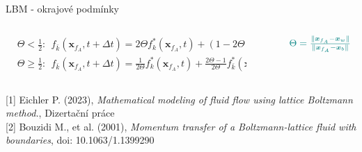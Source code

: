 \documentclass[aspectratio=169,xcolor=dvipsnames]{beamer}
\begin{document}
\begin{frame}{LBM - okrajové podmínky}
\begin{columns}
\begin{column}{.63\textwidth}
			$\begin{aligned}
				& \Theta<\frac{1}{2}: \ \ f_{\bar{k}}\left(\boldsymbol{x}_{f_A}, t+\Delta t\right)=2 \Theta f_k^*\left(\boldsymbol{x}_{f_A}, t\right)+(1-2 \Theta) f_k^*\left(\boldsymbol{x}_{f_B}, t\right) \\
				& \Theta \geq \frac{1}{2}: \ \ f_{\bar{k}}\left(\boldsymbol{x}_{f_A}, t+\Delta t\right)=\frac{1}{2 \Theta} f_k^*\left(\boldsymbol{x}_{f_A}, t\right)+\frac{2 \Theta-1}{2 \Theta} f_{\bar{k}}^*\left(\boldsymbol{x}_{f_A}, t\right)
			\end{aligned}$
		\end{column}
		\begin{column}{.25\textwidth}
			\begin{figure}
				$ \color{teal}
				\Theta=\frac{{\parallel}\boldsymbol{x}_{f_A}-\boldsymbol{x}_w {\parallel}}{{\parallel}\boldsymbol{x}_{f_A}-\boldsymbol{x}_b{\parallel}}$
			\end{figure}
		\end{column}%
	\end{columns}
	\vspace{3.5mm}
	\tiny{[1] Eichler P. (2023)}, \textit{Mathematical modeling of fluid flow using lattice Boltzmann
		method.}, Dizertační práce\\
	\tiny{[2] Bouzidi M., et al. (2001), \textit{Momentum transfer of a Boltzmann-lattice fluid with boundaries},  doi: 10.1063/1.1399290}

\end{frame}
\end{document}
